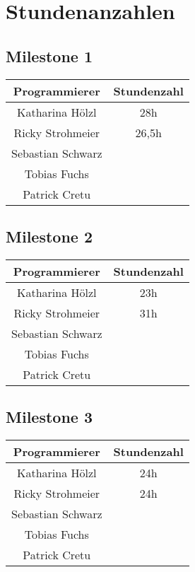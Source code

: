 \chapter{Stundenanzahlen}
\section{Milestone 1}
\begin{center}
	\begin{tabular}{|c|c|}
		\hline \textbf{Programmierer} & \textbf{Stundenzahl} \\ 
		\hline Katharina Hölzl  & 28h \\ 
		\hline Ricky Strohmeier & 26,5h \\ 
		\hline Sebastian Schwarz &  \\ 
		\hline Tobias Fuchs &  \\ 
		\hline Patrick Cretu &  \\ 
		\hline 
	\end{tabular}
\end{center} 
\section{Milestone 2}
\begin{center}
	\begin{tabular}{|c|c|}
		\hline \textbf{Programmierer} & \textbf{Stundenzahl} \\ 
		\hline Katharina Hölzl  & 23h  \\ 
		\hline Ricky Strohmeier & 31h\\ 
		\hline Sebastian Schwarz &  \\ 
		\hline Tobias Fuchs &  \\ 
		\hline Patrick Cretu &  \\ 
		\hline 
	\end{tabular}
\end{center} 
\section{Milestone 3}
\begin{center}
	\begin{tabular}{|c|c|}
		\hline \textbf{Programmierer} & \textbf{Stundenzahl} \\ 
		\hline Katharina Hölzl  & 24h \\ 
		\hline Ricky Strohmeier & 24h\\ 
		\hline Sebastian Schwarz &  \\ 
		\hline Tobias Fuchs &  \\ 
		\hline Patrick Cretu &  \\ 
		\hline 
	\end{tabular}
\end{center} 
